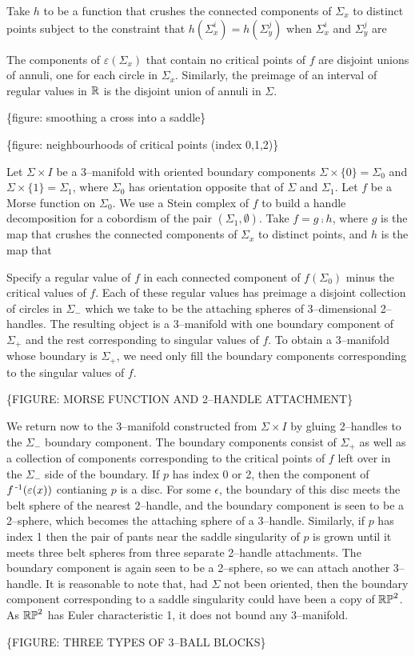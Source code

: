 Take $h$ to be a function that crushes the connected components of $\Sigma_x$ to distinct points subject to the constraint that $h(\Sigma_x^i)=h(\Sigma_y^j)$ when $\Sigma_x^i$ and $\Sigma_y^j$ are 



The components of $\varepsilon(\Sigma_x)$ that contain no critical points of $f$ are disjoint unions of annuli, one for each circle in $\Sigma_x$.
Similarly, the preimage of an interval of regular values in $\mathbb{R}$ is the disjoint union of annuli in $\Sigma$.

\{figure: smoothing a cross into a saddle\}

\{figure: neighbourhoods of critical points (index 0,1,2)\}



Let $\Sigma\times I$ be a 3--manifold with oriented boundary components $\Sigma\times\{0\}=\Sigma_0$ and $\Sigma\times\{1\}=\Sigma_1$, where $\Sigma_0$ has orientation opposite that of $\Sigma$ and $\Sigma_1$.
Let $f$ be a Morse function on $\Sigma_0$.
We use a Stein complex of $f$ to build a handle decomposition for a cobordism of the pair $(\Sigma_1,\emptyset)$.
Take $f=g\comp h$, where $g$ is the map that crushes the connected components of $\Sigma_x$ to distinct points, and $h$ is the map that 


 Specify a regular value of $f$ in each connected component of $f(\Sigma_0)$ minus the critical values of $f$.
Each of these regular values has preimage a disjoint collection of circles in $\Sigma_-$ which we take to be the attaching spheres of 3--dimensional 2--handles. 
The resulting object is a 3--manifold with one boundary component of $\Sigma_+$ and the rest corresponding to singular values of $f$.
To obtain a 3--manifold whose boundary is $\Sigma_+$, we need only fill the boundary components corresponding to the singular values of $f$.

\{FIGURE: MORSE FUNCTION AND 2--HANDLE ATTACHMENT\}



We return now to the 3--manifold constructed from $\Sigma\times I$ by gluing 2--handles to the $\Sigma_-$ boundary component.
The boundary components consist of $\Sigma_+$ as well as a collection of components corresponding to the critical points of $f$ left over in the $\Sigma_-$ side of the boundary.
If $p$ has index 0 or 2, then the component of $f^{\,\text{-}1}(\varepsilon(x))$ contianing $p$ is a disc.
For some $\epsilon$, the boundary of this disc meets the belt sphere of the nearest 2--handle, and the boundary component is seen to be a 2--sphere, which becomes the attaching sphere of a 3--handle.
Similarly, if $p$ has index 1 then the pair of pants near the saddle singularity of $p$ is grown until it meets three belt spheres from three separate 2--handle attachments.
The boundary component is again seen to be a 2--sphere, so we can attach another 3--handle.
It is reasonable to note that, had $\Sigma$ not been oriented, then the boundary component corresponding to a saddle singularity could have been a copy of $\mathbb{RP}^2$.
As $\mathbb{RP}^2$ has Euler characteristic 1, it does not bound any 3--manifold.

\{FIGURE: THREE TYPES OF 3--BALL BLOCKS\}
